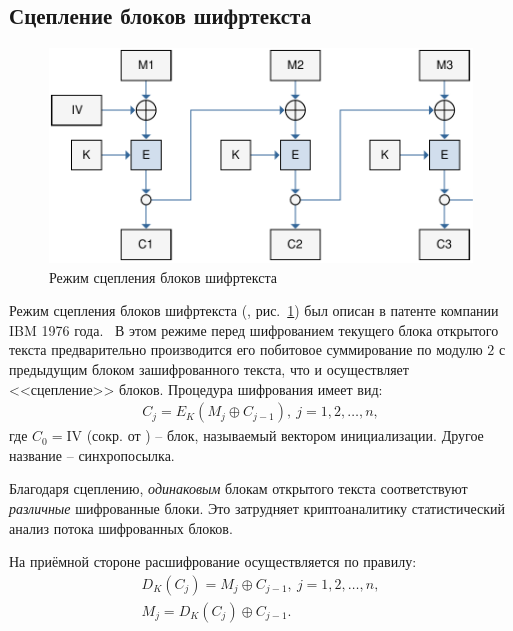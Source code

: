 \subsection{Сцепление блоков шифртекста}

\begin{figure}[bt]
	\centering
	\includegraphics[width=1\textwidth]{pic/CBC}
	\caption{Режим сцепления блоков шифртекста}
	\label{fig:CBC}
\end{figure}

Режим сцепления блоков шифртекста (, рис.~\ref{fig:CBC}) был описан в патенте компании IBM 1976 года.~\cite{Ehrsam:Meyer:Smith:Tuchman:1976} В этом режиме перед шифрованием текущего блока открытого текста предварительно производится его побитовое суммирование по модулю $2$ с предыдущим блоком зашифрованного текста, что и осуществляет <<сцепление>> блоков. Процедура шифрования имеет вид:
\[ \begin{array}{l}
    C_j = E_K(M_j \oplus C_{j-1}), ~ j = 1, 2, \dots, n,
\end{array} \]
где $C_0 = \textrm{IV}$ (сокр. от ) -- блок, называемый вектором инициализации. Другое название -- синхропосылка.

Благодаря сцеплению, \emph{одинаковым} блокам открытого текста соответствуют \emph{различные} шифрованные блоки. Это затрудняет криптоаналитику статистический анализ потока шифрованных блоков.

На приёмной стороне расшифрование осуществляется по правилу:
\[ \begin{array}{l}
    D_K(C_j) = M_j \oplus C_{j-1}, ~ j=1, 2, \dots, n,\\
    M_{j} = D_K(C_j) \oplus C_{j-1}.
\end{array} \]

